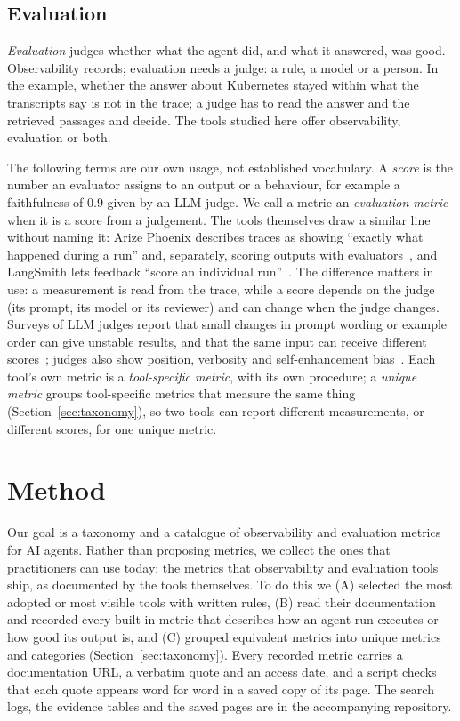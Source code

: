 \documentclass[conference]{IEEEtran}
\begin{document}
\subsection{Evaluation}\label{sec:eval}
\emph{Evaluation} judges whether what the agent did, and what it answered, was good. Observability records; evaluation needs a judge: a rule, a model or a person. In the example, whether the answer about Kubernetes stayed within what the transcripts say is not in the trace; a judge has to read the answer and the retrieved passages and decide. The tools studied here offer observability, evaluation or both.

The following terms are our own usage, not established vocabulary. A \emph{score} is the number an evaluator assigns to an output or a behaviour, for example a faithfulness of 0.9 given by an LLM judge. We call a metric an \emph{evaluation metric} when it is a score from a judgement. The tools themselves draw a similar line without naming it: Arize Phoenix describes traces as showing ``exactly what happened during a run'' and, separately, scoring outputs with evaluators~\cite{tool_arize_phoenix}, and LangSmith lets feedback ``score an individual run''~\cite{tool_langsmith}. The difference matters in use: a measurement is read from the trace, while a score depends on the judge (its prompt, its model or its reviewer) and can change when the judge changes. Surveys of LLM judges report that small changes in prompt wording or example order can give unstable results, and that the same input can receive different scores~\cite{gu2024judge}; judges also show position, verbosity and self-enhancement bias~\cite{zheng2023judge}.
Each tool's own metric is a \emph{tool-specific metric}, with its own procedure; a \emph{unique metric} groups tool-specific metrics that measure the same thing (Section~\ref{sec:taxonomy}), so two tools can report different measurements, or different scores, for one unique metric.

\section{Method}\label{sec:method}
Our goal is a taxonomy and a catalogue of observability and evaluation metrics for AI agents. Rather than proposing metrics, we collect the ones that practitioners can use today: the metrics that observability and evaluation tools ship, as documented by the tools themselves. To do this we (A) selected the most adopted or most visible tools with written rules, (B) read their documentation and recorded every built-in metric that describes how an agent run executes or how good its output is, and (C) grouped equivalent metrics into unique metrics and categories (Section~\ref{sec:taxonomy}). Every recorded metric carries a documentation URL, a verbatim quote and an access date, and a script checks that each quote appears word for word in a saved copy of its page. The search logs, the evidence tables and the saved pages are in the accompanying repository.
\end{document}
